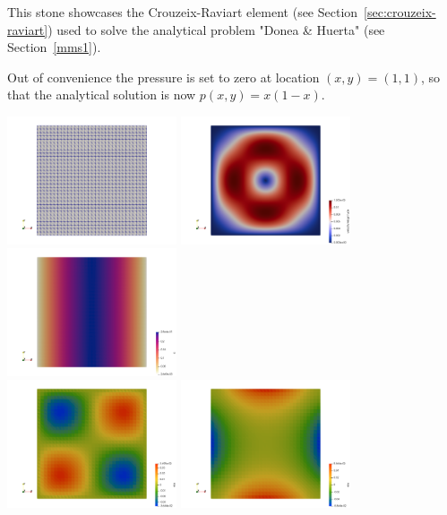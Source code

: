 
This stone showcases the Crouzeix-Raviart element (see Section~\ref{sec:crouzeix-raviart})
used to solve the analytical problem "Donea \& Huerta" (see Section~\ref{mms1}).

Out of convenience the pressure is set to zero at location $(x,y)=(1,1)$, so that the 
analytical solution is now $p(x,y)=x(1-x)$. 

\begin{center}
\includegraphics[width=5cm]{python_codes/fieldstone_46/grid}
\includegraphics[width=5cm]{python_codes/fieldstone_46/vel}
\includegraphics[width=5cm]{python_codes/fieldstone_46/press}\\
\includegraphics[width=5cm]{python_codes/fieldstone_46/exx}
\includegraphics[width=5cm]{python_codes/fieldstone_46/exy}
\end{center}

